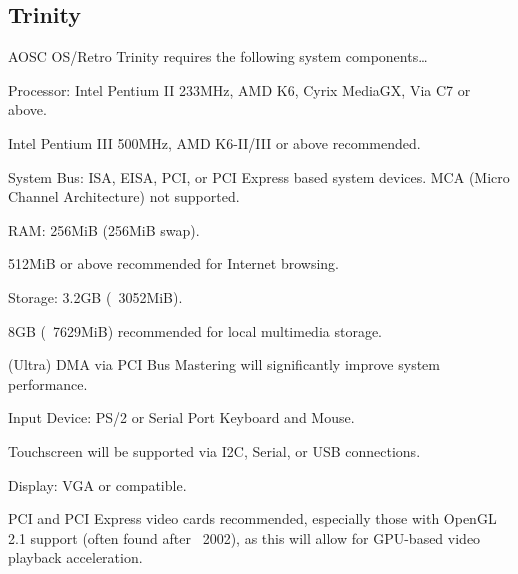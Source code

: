 \documentclass[a5paper,twosided,11pt]{book}
\begin{document}
    \subsection{Trinity}

    AOSC OS/Retro Trinity requires the following system components\ldots

    \begin{compactitem}
    \item Processor: Intel Pentium II 233MHz, AMD K6, Cyrix MediaGX, Via C7 or above.
        \begin{compactitem}
        \item Intel Pentium III 500MHz, AMD K6-II/III or above recommended.
        \end{compactitem}
    \item System Bus: ISA, EISA, PCI, or PCI Express based system devices. MCA (Micro Channel Architecture) not supported.
    \item RAM: 256MiB (256MiB swap).
        \begin{compactitem}
        \item 512MiB or above recommended for Internet browsing.
        \end{compactitem}
    \item Storage: 3.2GB (~3052MiB).
        \begin{compactitem}
        \item 8GB (~7629MiB) recommended for local multimedia storage.
        \item (Ultra) DMA via PCI Bus Mastering will significantly improve system performance.
        \end{compactitem}
    \item Input Device: PS/2 or Serial Port Keyboard and Mouse.
        \begin{compactitem}
        \item Touchscreen will be supported via I2C, Serial, or USB connections.
        \end{compactitem}
    \item Display: VGA or compatible.
        \begin{compactitem}
        \item PCI and PCI Express video cards recommended, especially those with OpenGL 2.1 support (often found after ~2002), as this will allow for GPU-based video playback acceleration.
        \end{compactitem}
    \end{compactitem}
\end{document}
